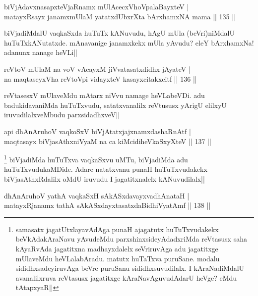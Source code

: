 
\begin{shl}
biVjAdavxnasapxteVjaRnamx mUlAcecxVhoVpalaBayxteV |\\
matayxRsayx janamxmUlaM yatatxdUbxrXta bArxhamxNA mama \hfill || 135 ||
\end{shl}

\begin{artha}
biVjadiMdalU vaqkaSxda huTuTx kANuvudu, hAgU mUla (beVri)niMdalU huTuTxkANutatxde. mAnavanige janamxkekx mUla yAvudu? eleY bArxhamxNa! adanunx nanage heVLi||
\end{artha}

\begin{shl}
reVtoV mUlaM na voV vAcayxM jiVvatasatxdidhx jAyateV |\\
na maqtaseyxVha reVtoV\s pi vidayxteV kasayxcitakxcitf \hfill || 136 ||
\end{shl}

\begin{artha}
reVtasesxV mUlaveMdu mAtarx niVvu namage heVLabeVDi. adu badukidavaniMda huTuTxvudu, satatxvanalilx reVtususx yArigU elilxyU iruvudilalxveMbudu parxsidadhxveV||
\end{artha}

\begin{shl}
api dhAnAruhoV vaqkoSxV biVjAtatxjajxnamxdashaRnAtf |\\
maqtasayx biVjasAthxniVyaM na ca kiMcidiheVkaSxyXteV \hfill || 137 ||
\end{shl}

\begin{artha}
\footnote[1]{samasatx jagatUtxlayavAdAga punaH ajagatutx huTuTxvudakekx beVkAdakAraNavu yAvudeMdu parxshinxsideyAdadxriMda reVtasusx saha kAyaRvAda jagatitxna madhayxdalelx seVriruvAga adu jagatitxge mUlaveMdu heVLalabAradu. matutx huTaTxva puruSane. modalu sididhxsadeyiruvAga beVre puruSanu sididhxsuvudilalx. I kAraNadiMdalU avanalilxruva reVtasusx jagatitxge kAraNavAguvudAdarU heVge? eMdu tAtapxyaR||} biVjadiMda huTuTxva vaqkaSxvu uMTu, biVjadiMda adu huTuTxvudukaMDide. Adare natatxvanu punaH huTuTxvudakekx biVjasAthxRdalilx oMdU iruvudu I jagatitxnalelx kANuvudilalx||
\end{artha}%

\begin{shl}
dhAnAruhoV yathA vaqkaSxH sAkASxdavayxvadhAnataH |\\
matayxRjanamx tathA sAkASxdayxtasatxdaBidhiVyatAmf \hfill || 138 ||
\end{shl}

